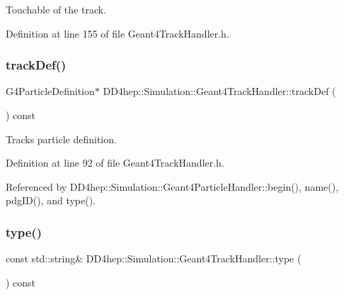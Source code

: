 Touchable of the track. 



Definition at line 155 of file Geant4\+Track\+Handler.\+h.

\hypertarget{class_d_d4hep_1_1_simulation_1_1_geant4_track_handler_ac6cfe20cc38d006243a07e9f9b8c198f}{}\label{class_d_d4hep_1_1_simulation_1_1_geant4_track_handler_ac6cfe20cc38d006243a07e9f9b8c198f} 
\subsubsection{\texorpdfstring{track\+Def()}{trackDef()}}
{\footnotesize\ttfamily G4\+Particle\+Definition$\ast$ D\+D4hep\+::\+Simulation\+::\+Geant4\+Track\+Handler\+::track\+Def (\begin{DoxyParamCaption}{ }\end{DoxyParamCaption}) const\hspace{0.3cm}{\ttfamily [inline]}}



Track\textquotesingle{}s particle definition. 



Definition at line 92 of file Geant4\+Track\+Handler.\+h.



Referenced by D\+D4hep\+::\+Simulation\+::\+Geant4\+Particle\+Handler\+::begin(), name(), pdg\+I\+D(), and type().

\hypertarget{class_d_d4hep_1_1_simulation_1_1_geant4_track_handler_a619850c062c24f0c3dc6138aae3ffbcb}{}\label{class_d_d4hep_1_1_simulation_1_1_geant4_track_handler_a619850c062c24f0c3dc6138aae3ffbcb} 
\subsubsection{\texorpdfstring{type()}{type()}}
{\footnotesize\ttfamily const std\+::string\& D\+D4hep\+::\+Simulation\+::\+Geant4\+Track\+Handler\+::type (\begin{DoxyParamCaption}{ }\end{DoxyParamCaption}) const\hspace{0.3cm}{\ttfamily [inline]}}



